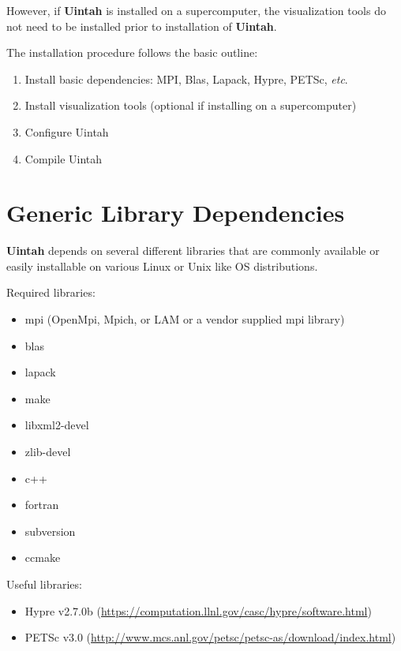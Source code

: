 \documentclass[12pt]{article}
\begin{document}
However, if \textbf{Uintah} is installed on a supercomputer, the
visualization tools do not need to be installed prior to installation
of \textbf{Uintah}.

The installation procedure follows the basic outline:

\begin{enumerate}

\item Install basic dependencies: MPI, Blas, Lapack, Hypre, PETSc, \emph{etc}.

\item Install visualization tools (optional if installing on a supercomputer)

\item Configure Uintah

\item Compile Uintah


\end{enumerate}


\section{Generic Library Dependencies}

\textbf{Uintah} depends on several different libraries that are commonly
available or easily installable on various Linux or Unix like OS
distributions.  

Required libraries:
\begin{itemize}
\item mpi (OpenMpi, Mpich, or LAM or a vendor supplied mpi library)
\item blas
\item lapack
\item make
\item libxml2-devel
\item zlib-devel
\item c++
\item fortran
\item subversion
\item ccmake

\end{itemize}

Useful libraries:
\begin{itemize}
\item Hypre v2.7.0b (\url{https://computation.llnl.gov/casc/hypre/software.html})
\item PETSc v3.0 (\url{http://www.mcs.anl.gov/petsc/petsc-as/download/index.html})
\end{itemize}
\end{document}
